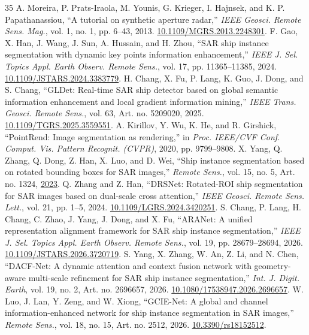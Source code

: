 \documentclass[journal]{IEEEtran}
\begin{document}
\begin{thebibliography}{35}
 A. Moreira, P. Prats-Iraola, M. Younis, G. Krieger, I. Hajnsek, and K. P. Papathanassiou, ``A tutorial on synthetic aperture radar,'' \emph{IEEE Geosci. Remote Sens. Mag.}, vol. 1, no. 1, pp. 6--43, 2013. \href{https://doi.org/10.1109/MGRS.2013.2248301}{10.1109/MGRS.2013.2248301}.
 F. Gao, X. Han, J. Wang, J. Sun, A. Hussain, and H. Zhou, ``SAR ship instance segmentation with dynamic key points information enhancement,'' \emph{IEEE J. Sel. Topics Appl. Earth Observ. Remote Sens.}, vol. 17, pp. 11365--11385, 2024. \href{https://doi.org/10.1109/JSTARS.2024.3383779}{10.1109/JSTARS.2024.3383779}.
 H. Chang, X. Fu, P. Lang, K. Guo, J. Dong, and S. Chang, ``GLDet: Real-time SAR ship detector based on global semantic information enhancement and local gradient information mining,'' \emph{IEEE Trans. Geosci. Remote Sens.}, vol. 63, Art. no. 5209020, 2025. \href{https://doi.org/10.1109/TGRS.2025.3559551}{10.1109/TGRS.2025.3559551}.
 A. Kirillov, Y. Wu, K. He, and R. Girshick, ``PointRend: Image segmentation as rendering,'' in \emph{Proc. IEEE/CVF Conf. Comput. Vis. Pattern Recognit. (CVPR)}, 2020, pp. 9799--9808.
 X. Yang, Q. Zhang, Q. Dong, Z. Han, X. Luo, and D. Wei, ``Ship instance segmentation based on rotated bounding boxes for SAR images,'' \emph{Remote Sens.}, vol. 15, no. 5, Art. no. 1324, \href{https://doi.org/10.3390/rs15051324}{2023}.
 Q. Zhang and Z. Han, ``DRSNet: Rotated-ROI ship segmentation for SAR images based on dual-scale cross attention,'' \emph{IEEE Geosci. Remote Sens. Lett.}, vol. 21, pp. 1--5, 2024. \href{https://doi.org/10.1109/LGRS.2024.3420251}{10.1109/LGRS.2024.3420251}.
 S. Chang, P. Lang, H. Chang, C. Zhao, J. Yang, J. Dong, and X. Fu, ``ARANet: A unified representation alignment framework for SAR ship instance segmentation,'' \emph{IEEE J. Sel. Topics Appl. Earth Observ. Remote Sens.}, vol. 19, pp. 28679--28694, 2026. \href{https://doi.org/10.1109/JSTARS.2026.3720719}{10.1109/JSTARS.2026.3720719}.
 S. Yang, X. Zhang, W. An, Z. Li, and N. Chen, ``DACF-Net: A dynamic attention and context fusion network with geometry-aware multi-scale refinement for SAR ship instance segmentation,'' \emph{Int. J. Digit. Earth}, vol. 19, no. 2, Art. no. 2696657, 2026. \href{https://doi.org/10.1080/17538947.2026.2696657}{10.1080/17538947.2026.2696657}.
 W. Luo, J. Lan, Y. Zeng, and W. Xiong, ``GCIE-Net: A global and channel information-enhanced network for ship instance segmentation in SAR images,'' \emph{Remote Sens.}, vol. 18, no. 15, Art. no. 2512, 2026. \href{https://doi.org/10.3390/rs18152512}{10.3390/rs18152512}.

\end{thebibliography}
\end{document}

